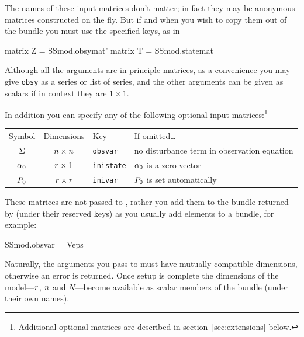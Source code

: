
The names of these input matrices don't matter; in fact they may be
anonymous matrices constructed on the fly. But if and when you wish to
copy them out of the bundle you must use the specified keys, as in
\begin{code}
matrix Z = SSmod.obsymat'
matrix T = SSmod.statemat
\end{code}

Although all the arguments are in principle matrices, as a convenience
you may give \texttt{obsy} as a series or list of series, and the
other arguments can be given as scalars if in context they are
$1 \times 1$.

In addition you can specify any of the following optional input
matrices:\footnote{Additional optional matrices are described in
section~\ref{sec:extensions} below.}

\begin{center}
  \begin{tabular}{ccll}
Symbol & Dimensions & Key & If omitted\dots \\[6pt]
$\Sigma$ & $n \times n$ & \texttt{obsvar} &
 no disturbance term in observation equation \\
$\alpha_0$ & $r \times 1$ & \texttt{inistate} &
 $\alpha_0$ is a zero vector\\
$P_0$ & $r \times r$ & \texttt{inivar} &
 $P_0$ is set automatically
\end{tabular}
\end{center}

These matrices are not passed to , rather you add them to
the bundle returned by  (under their reserved keys) as you
usually add elements to a bundle, for example:
\begin{code}
SSmod.obsvar = Veps
\end{code}

Naturally, the arguments you pass to  must have mutually
compatible dimensions, otherwise an error is returned. Once setup is
complete the dimensions of the model---$r$, $n$ and
$N$---become available as scalar members of the bundle (under their
own names).


